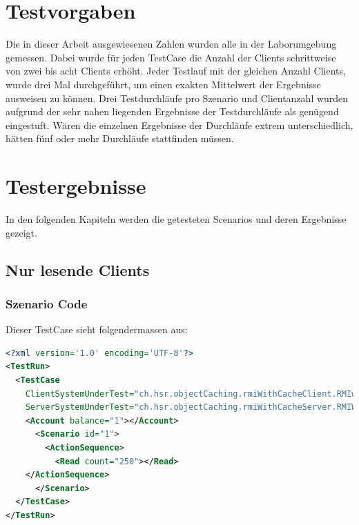 \section{Testvorgaben}
Die in dieser Arbeit ausgewiesenen Zahlen wurden alle in der La\-bor\-um\-gebung ge\-mes\-sen. Dabei wurde für jeden Test\-Case die An\-zahl der Clients schritt\-weise von zwei bis acht Clients erhöht. Jeder Test\-lauf mit der gleichen Anzahl Clients, wurde drei Mal durchgeführt, um einen exakten Mittel\-wert der Er\-geb\-nis\-se aus\-weisen zu können. Drei Test\-durchläufe pro Szenario und Clientanzahl wurden aufgrund der sehr nahen liegenden Er\-geb\-nis\-se der Testdurchläufe als genügend eingestuft. Wären die einzelnen Ergebnisse der Durchläufe extrem unterschiedlich, hätten fünf oder mehr Durchläufe stattfinden müssen.

\section{Testergebnisse}
In den folgenden Kapiteln werden die getesteten Scenarios und deren Ergebnisse gezeigt. 

\subsection{Nur lesende Clients}
\subsubsection{Szenario Code}
Dieser TestCase sieht folgendermassen aus:
\begin{lstlisting}[language=XML, breaklines=true]
<?xml version='1.0' encoding='UTF-8'?>
<TestRun>
  <TestCase
    ClientSystemUnderTest="ch.hsr.objectCaching.rmiWithCacheClient.RMIwithCacheClientSystem"
    ServerSystemUnderTest="ch.hsr.objectCaching.rmiWithCacheServer.RMIWithCacheServerSystem">
    <Account balance="1"></Account>
      <Scenario id="1">
        <ActionSequence>
          <Read count="250"></Read>
	</ActionSequence>
      </Scenario>
  </TestCase>
</TestRun>
\end{lstlisting}

